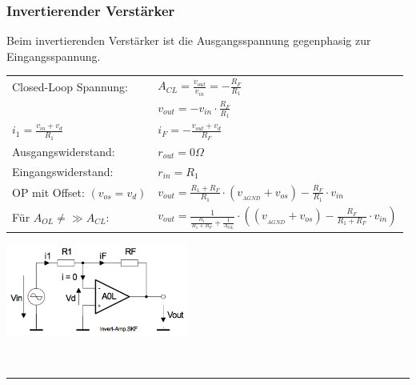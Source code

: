 		\subsubsection{Invertierender Verstärker}
			Beim invertierenden Verstärker ist die Ausgangsspannung gegenphasig
      		zur Eingangsspannung.\\
		\begin{minipage}[T]{13cm}
       		\begin{tabular}{ll}
       			Closed-Loop Spannung: & 
       				$A_{CL}=\frac{v_{out}}{v_{in}}=-\frac{R_F}{R_1}$\\
       				& $v_{out} = -v_{in}\cdot\frac{R_F}{R_1}$\\
       				$i_1=\frac{v_{in}+v_d}{R_1}$ & 
      				$i_F=-\frac{v_{out}+v_d}{R_F}$\\
       			Ausgangswiderstand:&
       				$r_{out}=0\Omega$\\
       			Eingangswiderstand: & 
       				$r_{in}=R_1$\\
       			OP mit Offset: $(v_{os}=v_d)$ & 
       					$v_{out} =  \frac{R_1+R_F}{R_1} \cdot (v_{_{AGND}}+v_{os})
       					-\frac{R_F}{R_1} \cdot v_{in}$ \\
       			Für $A_{OL} \neq \gg A_{CL}$: & $v_{out} = 
       			\frac{1}{\frac{R_1}{R_1+R_F}+\frac{1}{A_{OL}}}\cdot
       			\left( (v_{_{AGND}}+v_{os}) - \frac{R_F}{R_1+R_F} \cdot v_{in} \right)$
       		\end{tabular}
       	\end{minipage}
		\begin{minipage}{6cm}
       		\includegraphics[width=6cm]{./images/i-verstaerker.png}
      \end{minipage}\\
\hrule
      
